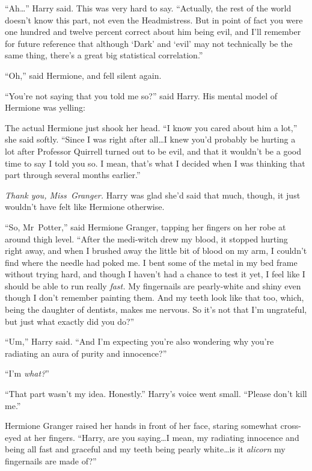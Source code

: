 “Ah…” Harry said. This was very hard to say. “Actually, the rest of the world doesn’t know this part, not even the Headmistress. But in point of fact you were one hundred and twelve percent correct about him being evil, and I’ll remember for future reference that although ‘Dark’ and ‘evil’ may not technically be the same thing, there’s a great big statistical correlation.”

“Oh,” said Hermione, and fell silent again.

“You’re not saying that you told me so?” said Harry. His mental model of Hermione was yelling: 

The actual Hermione just shook her head. “I know you cared about him a lot,” she said softly. “Since I was right after all…I knew you’d probably be hurting a lot after Professor Quirrell turned out to be evil, and that it wouldn’t be a good time to say I told you so. I mean, that’s what I decided when I was thinking that part through several months earlier.”

\emph{Thank you, Miss~Granger.} Harry was glad she’d said that much, though, it just wouldn’t have felt like Hermione otherwise.

“So, Mr~Potter,” said Hermione Granger, tapping her fingers on her robe at around thigh level. “After the medi-witch drew my blood, it stopped hurting right away, and when I brushed away the little bit of blood on my arm, I couldn’t find where the needle had poked me. I bent some of the metal in my bed frame without trying hard, and though I haven’t had a chance to test it yet, I feel like I should be able to run really \emph{fast.} My fingernails are pearly-white and shiny even though I don’t remember painting them. And my teeth look like that too, which, being the daughter of dentists, makes me nervous. So it’s not that I’m ungrateful, but just what exactly did you do?”

“Um,” Harry said. “And I’m expecting you’re also wondering why you’re radiating an aura of purity and innocence?”

“I’m \emph{what?}”

“That part wasn’t my idea. Honestly.” Harry’s voice went small. “Please don’t kill me.”

Hermione Granger raised her hands in front of her face, staring somewhat cross-eyed at her fingers. “Harry, are you saying…I mean, my radiating innocence and being all fast and graceful and my teeth being pearly white…is it \emph{alicorn} my fingernails are made of?”

